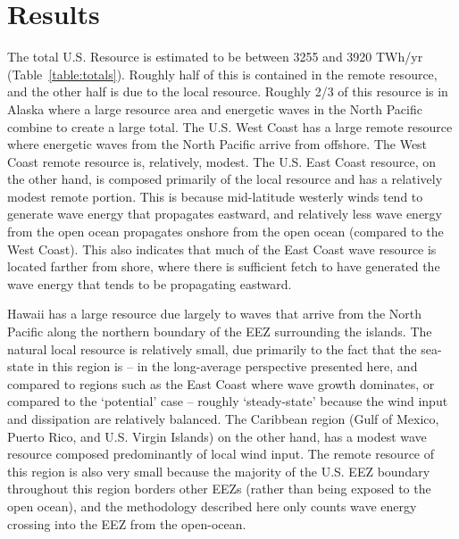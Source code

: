 \section{Results}

The total U.S. Resource is estimated to be between 3255 and 3920 TWh/yr (Table~\ref{table:totals}). Roughly half of this is contained in the remote resource, and the other half is due to the local resource. Roughly 2/3 of this resource is in Alaska where a large resource area and energetic waves in the North Pacific combine to create a large total. The U.S. West Coast has a large remote resource where energetic waves from the North Pacific arrive from offshore.  The West Coast remote resource is, relatively, modest. The U.S. East Coast resource, on the other hand, is composed primarily of the local resource and has a relatively modest remote portion. This is because mid-latitude westerly winds tend to generate wave energy that propagates eastward, and relatively less wave energy from the open ocean propagates onshore from the open ocean (compared to the West Coast). This also indicates that much of the East Coast wave resource is located farther from shore, where there is sufficient fetch to have generated the wave energy that tends to be propagating eastward. 

Hawaii has a large resource due largely to waves that arrive from the North Pacific along the northern boundary of the EEZ surrounding the islands. The natural local resource is relatively small, due primarily to the fact that the sea-state in this region is -- in the long-average perspective presented here, and compared to regions such as the East Coast where wave growth dominates, or compared to the `potential' case -- roughly `steady-state' because the wind input and dissipation are relatively balanced. The Caribbean region (Gulf of Mexico, Puerto Rico, and U.S. Virgin Islands) on the other hand, has a modest wave resource composed predominantly of local wind input.  The remote resource of this region is also very small because the majority of the U.S. EEZ boundary throughout this region borders other EEZs (rather than being exposed to the open ocean), and the methodology described here only counts wave energy crossing into the EEZ from the open-ocean. 

